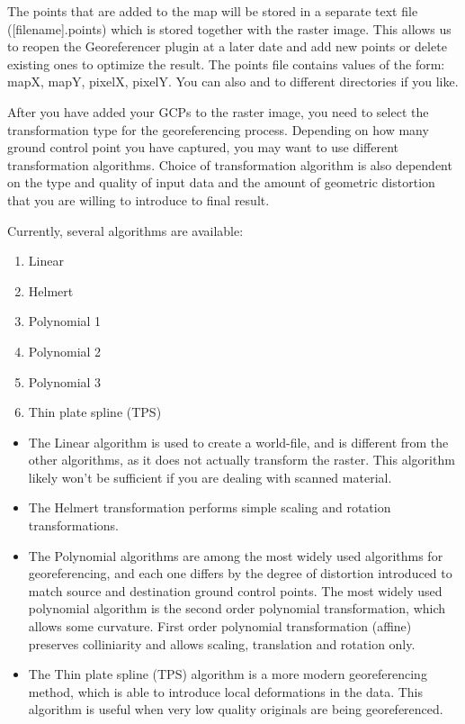 The points that are added to the map will be stored in a separate text file ([filename].points) which is stored together with the raster image. This allows us to reopen the Georeferencer plugin at a later date and add new points or delete existing ones to optimize the result. The points file contains values of the form: mapX, mapY, pixelX, pixelY. You can also  and  to different directories if you like.

\label{georeferencer_transformation}

After you have added your GCPs to the raster image, you need to select the transformation type for the georeferencing process. Depending on how many ground control point you have captured, you may want to use different transformation algorithms. Choice of transformation algorithm is also dependent on the type and quality of input data and the amount of geometric distortion that you are willing to introduce to final result.

Currently, several algorithms are available:

\begin{enumerate}
\item Linear
\item Helmert
\item Polynomial 1
\item Polynomial 2
\item Polynomial 3
\item Thin plate spline (TPS)
\end{enumerate}

\begin{itemize}
\item The Linear algorithm is used to create a world-file, and is different from the other algorithms, as it does not actually transform the raster. This algorithm likely won't be sufficient if you are dealing with scanned material.
\item The Helmert transformation performs simple scaling and rotation transformations. 
\item The Polynomial algorithms are among the most widely used algorithms for georeferencing, and each one differs by the degree of distortion introduced to match source and destination ground control points. The most widely used polynomial algorithm is the second order polynomial transformation, which allows some curvature. First order polynomial transformation (affine) preserves colliniarity and allows scaling, translation and rotation only.
\item The Thin plate spline (TPS) algorithm is a more modern georeferencing method, which is able to introduce local deformations in the data. This algorithm is useful when very low quality originals are being georeferenced.
\end{itemize}

